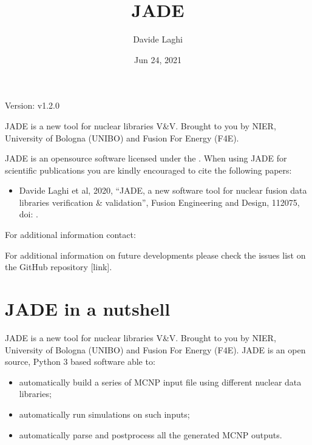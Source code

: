 \documentclass[letterpaper,10pt,english]{sphinxmanual}
\title{JADE}
\date{Jun 24, 2021}
\author{Davide Laghi}
\let\sphinxpxdimen\pdfpxdimen\else\newdimen\sphinxpxdimen
\begin{document}
\pagestyle{empty}
\sphinxmaketitle
\pagestyle{plain}
\sphinxtableofcontents
\pagestyle{normal}
\label{\detokenize{index::doc}}


Version: v1.2.0

JADE is a new tool for nuclear libraries V\&V.
Brought to you by NIER, University of Bologna (UNIBO) and Fusion For Energy (F4E).

JADE is an open\sphinxhyphen{}source software licensed under the {\hyperref[\detokenize{LICENSE:gnulicense}]{}}.
When using JADE for scientific publications you are kindly encouraged to cite the following papers:
\begin{itemize}
\item {} 
Davide Laghi et al, 2020, “JADE, a new software tool for nuclear fusion data libraries verification \& validation”,
Fusion Engineering and Design,  112075, doi: .

\end{itemize}

For additional information contact: 

For additional information on future developments please check the issues list on the
GitHub repository {[}link{]}.


\chapter{JADE in a nutshell}
\label{\detokenize{nutshell:jade-in-a-nutshell}}\label{\detokenize{nutshell::doc}}
\noindent\sphinxincludegraphics[width=600\sphinxpxdimen]{{scheme}.png}

JADE is a new tool for nuclear libraries V\&V.
Brought to you by NIER, University of Bologna (UNIBO) and Fusion For Energy (F4E).
JADE is an open source, Python 3 based software able to:
\begin{itemize}
\item {} 
automatically build a series of MCNP input file using different nuclear
data libraries;

\item {} 
automatically run simulations on such inputs;

\item {} 
automatically parse and post\sphinxhyphen{}process all the generated MCNP outputs.

\end{itemize}
\end{document}
